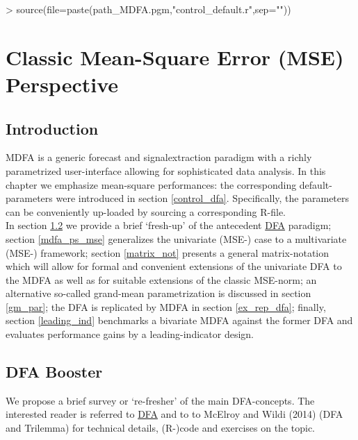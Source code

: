 \documentclass[a4paper]{book}
\begin{document}
\begin{Schunk}
\begin{Sinput}
> source(file=paste(path_MDFA.pgm,"control_default.r",sep=""))
\end{Sinput}
\end{Schunk}







\chapter{Classic Mean-Square Error (MSE) Perspective}\label{mse_sec}

\section{Introduction}

MDFA is a generic forecast and signalextraction paradigm with a richly parametrized user-interface allowing for sophisticated data analysis. In this chapter we emphasize mean-square performances: the corresponding default-parameters were introduced in section \ref{control_dfa}. Specifically, the parameters can be conveniently up-loaded by sourcing a corresponding R-file. \\

In section \ref{fresh_up} we provide a brief `fresh-up' of the antecedent \href{http://blog.zhaw.ch/sef/files/2014/10/DFA.pdf}{DFA} paradigm; section \ref{mdfa_ps_mse} generalizes the univariate (MSE-) case to a multivariate (MSE-) framework; section \ref{matrix_not} presents a general matrix-notation which will allow for formal and convenient extensions of the univariate DFA to the MDFA as well as for suitable extensions of the classic MSE-norm; an alternative so-called grand-mean parametrization is discussed in section \ref{gm_par}; the DFA is replicated by MDFA in section \ref{ex_rep_dfa}; finally, section \ref{leading_ind} benchmarks a bivariate MDFA against the former DFA and evaluates performance gains by a leading-indicator design.

\section{DFA Booster}\label{fresh_up}

We propose a brief survey or `re-fresher' of the main DFA-concepts. The interested reader is referred  to \href{http://blog.zhaw.ch/sef/files/2014/10/DFA.pdf}{DFA} and to to McElroy and Wildi (2014) (DFA and Trilemma) for technical details, (R-)code and exercises on the topic.
\end{document}
